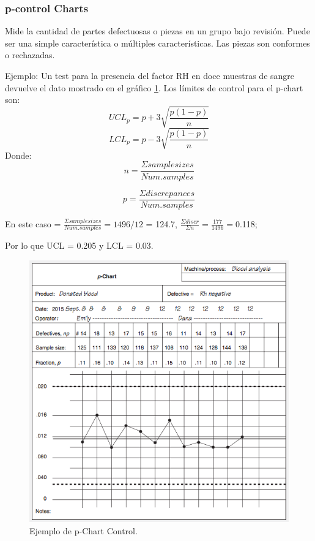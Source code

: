 \documentclass[]{article}
\begin{document}
\subsubsection{p-control Charts}
Mide la cantidad de partes defectuosas o piezas en un grupo bajo revisión. Puede ser una simple característica o múltiples características. 
Las piezas son conformes o rechazadas. 

Ejemplo: Un test para la presencia del factor RH en doce muestras de sangre devuelve el dato mostrado en el gráfico \ref{fig:pChartEjemplo}.
Los límites de control para el p-chart son:
\begin{equation}
UCL_p = p + 3 \sqrt{\frac{p(1-p)}{n}}
\end{equation}
\begin{equation}
LCL_p = p - 3 \sqrt{\frac{p(1-p)}{n}}
\end{equation}
Donde:
\begin{equation}
n = \frac{\Sigma sample sizes}{Num. samples}
\end{equation}

\begin{equation}
p = \frac{\Sigma discrepances}{Num. samples}
\end{equation}

En este caso = $\frac{\Sigma sample sizes}{Num. samples} = 1496 / 12$ = 124.7, $\frac{\Sigma discr}{\Sigma n} = \frac{177}{1496} = $0.118;

Por lo que UCL = 0.205 y LCL = 0.03.

\begin{figure}[H]
	\centering
	\includegraphics[width=120mm]{imagenes/pChartEjemplo.png}
	\caption{Ejemplo de p-Chart Control.}
	\label{fig:pChartEjemplo}
\end{figure}
\end{document}
